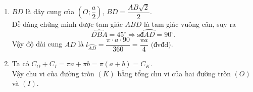 \begin{bt}
{\begin{enumerate}
\begin{itemize}
			\end{itemize}
			\item $BD$ là dây cung của $\left(O;\dfrac{a}{2}\right)$, $BD=\dfrac{AB\sqrt{2}}{2}$.\\
			Dễ dàng chứng minh được tam giác $ABD$ là tam giác vuông cân, suy ra 
			\[ \widehat {DBA} = 45^ \circ \Rightarrow \text{sđ}\wideparen{AD} = 90^\circ.\]
			Vậy độ dài cung $AD$ là $l_{\wideparen{AD}}=\dfrac{\pi \cdot a \cdot 90}{360} = \dfrac{\pi a}{4} \text{ (đvđd)}$.
			\item Ta có $C_O+C_I=\pi a + \pi b = \pi (a+b) = C_K$.\\
			Vậy chu vi của đường tròn $(K)$ bằng tổng chu vi của hai đường tròn $(O)$ và $(I)$.
		\end{enumerate}
	}
\end{bt}

